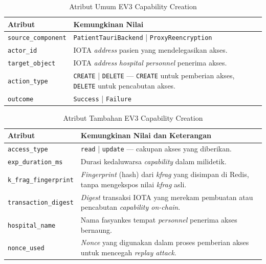 \begin{table}[htbp]
\centering
\caption{Atribut Umum EV3 Capability Creation}
\label{tab:ev3-umum}
\renewcommand{\arraystretch}{1.3}
\begin{tabular}{|p{3.5cm}|p{8.5cm}|}
\hline
\textbf{Atribut} & \textbf{Kemungkinan Nilai} \\
\hline
\texttt{source\_component} &
\texttt{PatientTauriBackend} | \texttt{ProxyReencryption} \\
\hline
\texttt{actor\_id} &
IOTA \textit{address} pasien yang mendelegasikan akses. \\
\hline
\texttt{target\_object} &
IOTA \textit{address} \textit{hospital personnel} penerima akses. \\
\hline
\texttt{action\_type} &
\texttt{CREATE} | \texttt{DELETE} --- \texttt{CREATE} untuk pemberian
akses, \texttt{DELETE} untuk pencabutan akses. \\
\hline
\texttt{outcome} &
\texttt{Success} | \texttt{Failure} \\
\hline
\end{tabular}
\end{table}

\begin{table}[htbp]
\centering
\caption{Atribut Tambahan EV3 Capability Creation}
\label{tab:ev3-detail}
\renewcommand{\arraystretch}{1.3}
\begin{tabular}{|p{4cm}|p{7.5cm}|}
\hline
\textbf{Atribut} & \textbf{Kemungkinan Nilai dan Keterangan} \\
\hline
\texttt{access\_type} &
\texttt{read} | \texttt{update} --- cakupan akses yang diberikan. \\
\hline
\texttt{exp\_duration\_ms} &
Durasi kedaluwarsa \textit{capability} dalam milidetik. \\
\hline
\texttt{k\_frag\_fingerprint} &
\textit{Fingerprint} (hash) dari \textit{kfrag} yang disimpan di Redis,
tanpa mengekspos nilai \textit{kfrag} asli. \\
\hline
\texttt{transaction\_digest} &
\textit{Digest} transaksi IOTA yang merekam pembuatan atau pencabutan
\textit{capability on-chain}. \\
\hline
\texttt{hospital\_name} &
Nama fasyankes tempat \textit{personnel} penerima akses bernaung. \\
\hline
\texttt{nonce\_used} &
\textit{Nonce} yang digunakan dalam proses pemberian akses untuk mencegah
\textit{replay attack}. \\
\hline
\end{tabular}
\end{table}

